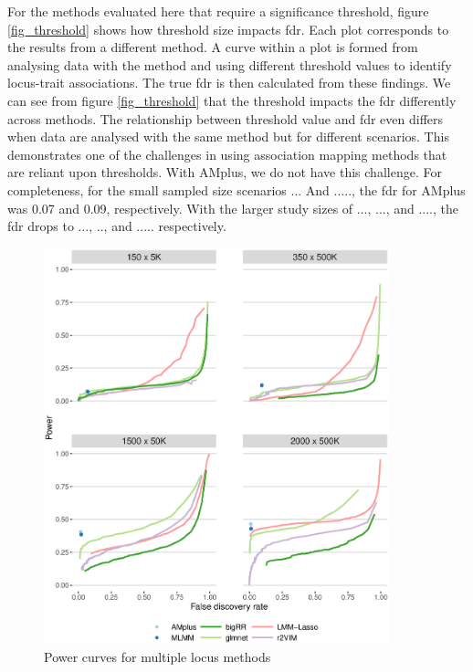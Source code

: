\documentclass{nature}
\begin{document}
For the methods evaluated here that require a significance threshold, figure  \ref{fig_threshold}  shows how 
threshold size impacts fdr. Each plot corresponds to the results from a different method. 
A curve within a plot is formed from analysing data with the method and using different threshold values to identify locus-trait associations. 
The true fdr is then calculated from these findings.
We can see from figure \ref{fig_threshold}  that the threshold impacts the fdr differently across methods. The relationship between threshold value and fdr even differs when data are analysed with the same method but for different scenarios. This demonstrates one of the challenges in using association mapping methods that are reliant upon thresholds. With AMplus, we do not have this challenge. For completeness, for the small sampled size scenarios ... And ....., the fdr for AMplus was 0.07 and 0.09, respectively. With the larger study sizes of ..., ..., and ...., the fdr drops to ..., .., and ..... respectively.


\begin{figure}
\label{fig_power_multiple}
\caption{Power curves for  multiple locus methods}
\includegraphics[width=10cm]{powerMultiple}
\end{figure}
\end{document}
